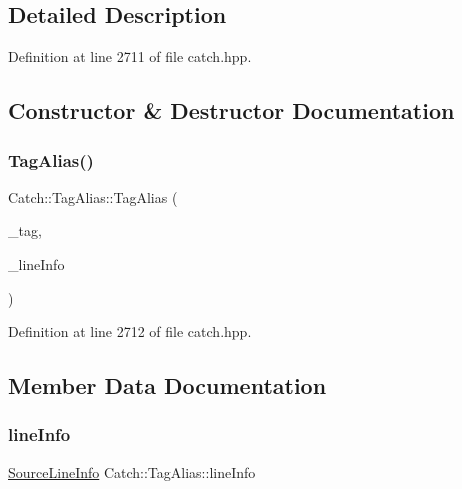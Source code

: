 \subsection{Detailed Description}


Definition at line 2711 of file catch.\+hpp.



\subsection{Constructor \& Destructor Documentation}
\hypertarget{struct_catch_1_1_tag_alias_ad9124d03bfb6f767f1c97572330b05bc}{}\label{struct_catch_1_1_tag_alias_ad9124d03bfb6f767f1c97572330b05bc} 
\subsubsection{\texorpdfstring{Tag\+Alias()}{TagAlias()}}
{\footnotesize\ttfamily Catch\+::\+Tag\+Alias\+::\+Tag\+Alias (\begin{DoxyParamCaption}\item[{std\+::string}]{\+\_\+tag,  }\item[{\hyperlink{struct_catch_1_1_source_line_info}{Source\+Line\+Info}}]{\+\_\+line\+Info }\end{DoxyParamCaption})\hspace{0.3cm}{\ttfamily [inline]}}



Definition at line 2712 of file catch.\+hpp.



\subsection{Member Data Documentation}
\hypertarget{struct_catch_1_1_tag_alias_a2f51fe0b3c052561275d26b6eb88f702}{}\label{struct_catch_1_1_tag_alias_a2f51fe0b3c052561275d26b6eb88f702} 
\subsubsection{\texorpdfstring{line\+Info}{lineInfo}}
{\footnotesize\ttfamily \hyperlink{struct_catch_1_1_source_line_info}{Source\+Line\+Info} Catch\+::\+Tag\+Alias\+::line\+Info}



